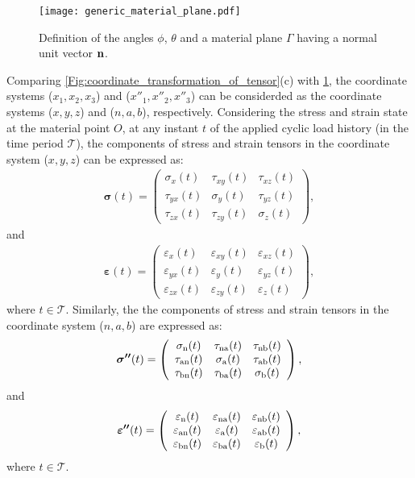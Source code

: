 \begin{figure}
\centering
\texttt{[image: generic\_material\_plane.pdf]}
\caption{Definition of the angles $\phi$, $\theta$ and a material plane $\Gamma$ having a normal unit vector ${\bf{n}}$.}
\label{Fig:generic_material_plane}
\end{figure}
Comparing \ref{Fig:coordinate_transformation_of_tensor}(c) with \ref{Fig:generic_material_plane}, the coordinate systems ($x_1,x_2,x_3$) and ($x''_1,x''_2,x''_3$) can be considerded as the coordinate systems ($x,y,z$) and ($n,a,b$), respectively. Considering the stress and strain state at the material point $O$, at any instant $t$ of the applied cyclic load history (in the time period $\mathscr{T}$), the components of stress and strain tensors in the coordinate system ($x,y,z$) can be expressed as:
\begin{eqnarray}
{\bm{\sigma }}(t) = \left( {\begin{array}{*{20}{c}}
{{\sigma _{x}}(t)}&{{\tau _{xy}}(t)}&{{\tau _{xz}}(t)}\\
{{\tau _{yx}}(t)}&{{\sigma _{y}}(t)}&{{\tau _{yz}}(t)}\\
{{\tau _{zx}}(t)}&{{\tau _{zy}}(t)}&{{\sigma _{z}}(t)}
\end{array}} \right),
\end{eqnarray}
and
\begin{eqnarray}
{\bm{\varepsilon }}(t) = \left( {\begin{array}{*{20}{c}}
{{\varepsilon _{x}}(t)}&{{\varepsilon _{xy}}(t)}&{{\varepsilon _{xz}}(t)}\\
{{\varepsilon _{yx}}(t)}&{{\varepsilon _{y}}(t)}&{{\varepsilon _{yz}}(t)}\\
{{\varepsilon _{zx}}(t)}&{{\varepsilon _{zy}}(t)}&{{\varepsilon _{z}}(t)}
\end{array}} \right),
\end{eqnarray}
where $t \in \mathscr{T}$.
Similarly, the the components of stress and strain tensors in the coordinate system ($n,a,b$) are expressed as:
\begin{eqnarray}
{\bm{\sigma ''}}(t) = \left( {\begin{array}{*{20}{c}}
{{\sigma _{{\rm{n}}}}(t)}&{{\tau _{{\rm{na}}}}(t)}&{{\tau _{{\rm{nb}}}}(t)}\\
{{\tau _{{\rm{an}}}}(t)}&{{\sigma _{{\rm{a}}}}(t)}&{{\tau _{{\rm{ab}}}}(t)}\\
{{\tau _{{\rm{bn}}}}(t)}&{{\tau _{{\rm{ba}}}}(t)}&{{\sigma _{{\rm{b}}}}(t)}
\end{array}} \right),
\end{eqnarray}
and
\begin{eqnarray}
{\bm{\varepsilon ''}}(t) = \left( {\begin{array}{*{20}{c}}
{{\varepsilon _{{\rm{n}}}}(t)}&{{\varepsilon _{{\rm{na}}}}(t)}&{{\varepsilon _{{\rm{nb}}}}(t)}\\
{{\varepsilon _{{\rm{an}}}}(t)}&{{\varepsilon _{{\rm{a}}}}(t)}&{{\varepsilon _{{\rm{ab}}}}(t)}\\
{{\varepsilon _{{\rm{bn}}}}(t)}&{{\varepsilon _{{\rm{ba}}}}(t)}&{{\varepsilon _{{\rm{b}}}}(t)}
\end{array}} \right),
\end{eqnarray}
where $t \in \mathscr{T}$.

